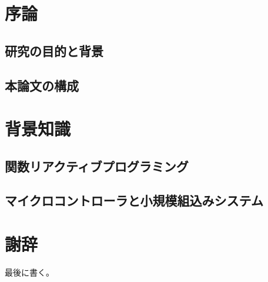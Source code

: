 \chapter{序論}
\section{研究の目的と背景}
\section{本論文の構成}
\cite{suzuki2016cfrp}

\chapter{背景知識}
\section{関数リアクティブプログラミング}
\section{マイクロコントローラと小規模組込みシステム}

\chapter*{謝辞}
最後に書く。
